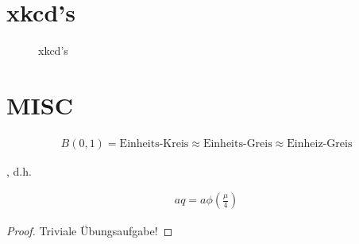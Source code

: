 \documentclass{article}
\begin{document}
\section{xkcd's}

\begin{figure}[H]
  \centering
  \hspace{0mm}
  \caption{xkcd's}
  \label{fig:xkcd}
\end{figure}

\section{MISC}

\begin{theorem}

  \begin{align*}
    B(0, 1)
    =
    \text{Einheits-Kreis}
    \approx
    \text{Einheits-Greis}
    \approx
    \text{Einheiz-Greis}
  \end{align*}

\end{theorem}

\begin{theorem}

  , d.h.

  \begin{align}
    aq = a \phi \left( \frac{\mu}{4} \right)
  \end{align}

\end{theorem}

\begin{proof}
  Triviale Übungsaufgabe!
\end{proof}
\end{document}
